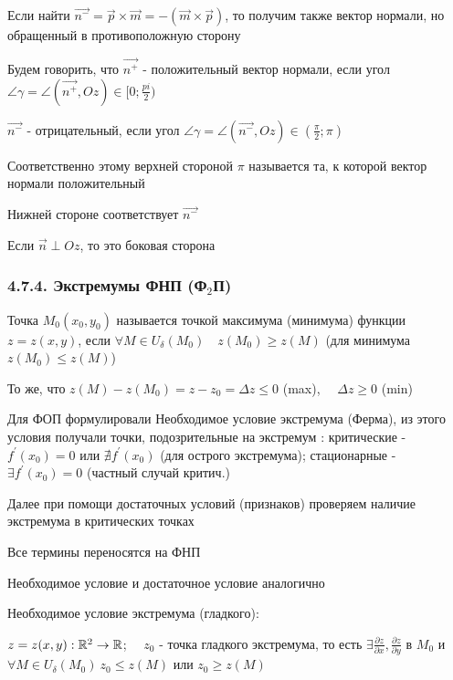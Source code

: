 \documentclass[12pt]{article}
\begin{document}
    \Nota Если найти $\overrightarrow{n^-} = \overrightarrow{p} \times \overrightarrow{m} = - (\overrightarrow{m} \times \overrightarrow{p})$, то получим также вектор нормали, но обращенный в противоположную сторону

    Будем говорить, что $\overrightarrow{n^+}$ - положительный вектор нормали, если угол $\angle\gamma = \angle (\overrightarrow{n^+}, Oz) \in [0; \frac{pi}{2})$

    $\overrightarrow{n^-}$ - отрицательный, если угол $\angle\gamma = \angle (\overrightarrow{n^-}, Oz) \in \left(\frac{\pi}{2}; \pi\right)$

    Соответственно этому верхней стороной $\pi$ называется та, к которой вектор нормали положительный

    Нижней стороне соответствует $\overrightarrow{n^-}$

    Если $\overrightarrow{n} \perp Oz$, то это боковая сторона

    \subsubsection{4.7.4. Экстремумы ФНП (Ф$_2$П)}

    \hypertarget{extremumsoffunctions}{}

    \Def Точка $M_0(x_0, y_0)$ называется точкой максимума (минимума) функции $z = z(x, y)$, если $\forall M \in U_\delta (M_0) \quad z(M_0) \geq z(M)$ (для минимума $z(M_0) \leq z(M)$)

    \Nota То же, что $z(M) - z(M_0) = z - z_0 = \Delta z \leq 0$ (max), $\quad \Delta z \geq 0$ (min)

    \Mem Для ФОП формулировали Необходимое условие экстремума (Ферма), из этого условия получали точки, подозрительные на экстремум : критические - $f^\prime(x_0) = 0$ или $\nexists f^\prime(x_0)$ (для острого экстремума); стационарные - $\exists f^\prime(x_0) = 0$ (частный случай критич.)

    Далее при помощи достаточных условий (признаков) проверяем наличие экстремума в критических точках

    \Nota Все термины переносятся на ФНП

    Необходимое условие и достаточное условие аналогично

    \hypertarget{extremumnecessarycondition}{}

    \Th Необходимое условие экстремума (гладкого):

    $z = z(x, y) : \mathbb{R}^2 \rightarrow \mathbb{R}$; $\quad z_0$ - точка гладкого экстремума,
    то есть $\exists \frac{\partial z}{\partial x}, \frac{\partial z}{\partial y}$ в $M_0$ и $\forall M \in U_\delta(M_0) \ z_0 \leq z(M)$ или $z_0 \geq z(M)$
\end{document}
